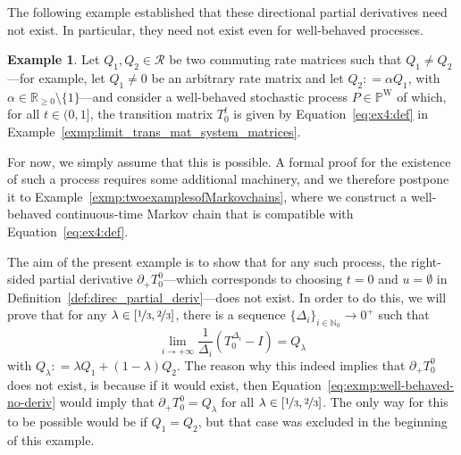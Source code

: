 \documentclass[10pt,a4paper]{paper}
\theoremstyle{definition}
\newtheorem{exmp}{Example}%
\newcommand{\nats}{\mathbb{N}}
\newcommand{\reals}{\mathbb{R}}
\newcommand{\realsnonneg}{\reals_{\geq 0}}
\newcommand{\processes}{\mathbb{P}}
\newcommand{\wprocesses}{\processes^{\mathrm{W}}}
\newcommand{\coloneqq}{:\!=}
\begin{document}
The following example established that these directional partial derivatives need not exist. In particular, they need not exist even for well-behaved processes.
\begin{exmp}\label{exmp:well-behaved-no-deriv}
Let $Q_1,Q_2\in\mathcal{R}$ be two commuting rate matrices such that $Q_1\neq Q_2$---for example, let $Q_1\neq0$ be an arbitrary rate matrix and let $Q_2\coloneqq\alpha Q_1$, with $\alpha\in\realsnonneg\setminus\{1\}$---and consider a well-behaved stochastic process $P\in\wprocesses$ of which, for all $t\in(0,1]$, the transition matrix $T_0^t$ is given by Equation~\eqref{eq:ex4:def} in Example~\ref{exmp:limit_trans_mat_system_matrices}. 

For now, we simply assume that this is possible. A formal proof for the existence of such a process requires some additional machinery, and we therefore postpone it to Example~\ref{exmp:twoexamplesofMarkovchains}, where we construct a well-behaved continuous-time Markov chain that is compatible with Equation~\eqref{eq:ex4:def}.

The aim of the present example is to show that for any such process, the right-sided partial derivative $\partial_{+}{T_{0}^0}$---which corresponds to choosing $t=0$ and $u=\emptyset$ in Definition~\ref{def:direc_partial_deriv}---does not exist. In order to do this, we will prove that for any $\lambda\in[\nicefrac{1}{3},\nicefrac{2}{3}]$, there is a sequence $\{\Delta_i\}_{i\in\nats_0}\to0^+$ such that
\begin{equation}\label{eq:exmp:well-behaved-no-deriv}
\lim_{i\to+\infty}
\frac{1}{\Delta_i}
(T^{\Delta_i}_{0}-I)=Q_\lambda
\end{equation}
with $Q_\lambda\coloneqq \lambda Q_1+(1-\lambda)Q_2$. The reason why this indeed implies that $\partial_{+}{T_{0}^0}$ does not exist, is because if it would exist, then Equation~\eqref{eq:exmp:well-behaved-no-deriv} would imply that $\partial_{+}{T_{0}^0}=Q_\lambda$ for all $\lambda\in[\nicefrac{1}{3},\nicefrac{2}{3}]$. The only way for this to be possible would be if $Q_1=Q_2$, but that case was excluded in the beginning of this example.


\end{exmp}
\end{document}

